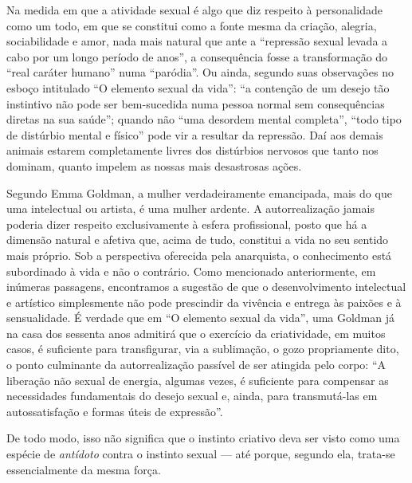 Na medida em que a
atividade sexual é algo que diz respeito à personalidade como um todo,
em que se constitui como a fonte mesma da criação, alegria,
sociabilidade e amor, nada mais natural que ante a ``repressão sexual
levada a cabo por um longo período de anos'', a consequência fosse
a transformação do ``real caráter humano'' numa
``paródia''. Ou ainda, segundo suas observações no esboço intitulado ``O
elemento sexual da vida'': ``a contenção de um desejo tão instintivo não
pode ser bem-sucedida numa pessoa normal sem consequências diretas na
sua saúde''; quando não ``uma desordem mental completa'', ``todo tipo de
distúrbio mental e físico'' pode vir a resultar da repressão. Daí aos
demais animais estarem completamente livres dos distúrbios nervosos que
tanto nos dominam, quanto impelem as nossas mais desastrosas ações.

Segundo Emma Goldman, a mulher verdadeiramente emancipada, mais do que
uma intelectual ou artista, é uma mulher ardente. A autorrealização
jamais poderia dizer respeito exclusivamente à esfera profissional,
posto que há a dimensão natural e afetiva que, acima de tudo, constitui
a vida no seu sentido mais próprio. Sob a perspectiva oferecida pela
anarquista, o conhecimento está subordinado à vida e não o contrário.
Como mencionado anteriormente, em inúmeras passagens, encontramos a
sugestão de que o desenvolvimento intelectual e artístico simplesmente
não pode prescindir da vivência e entrega às paixões e à sensualidade. É
verdade que em ``O elemento sexual da vida'', uma Goldman já na casa dos
sessenta anos admitirá que o exercício da criatividade, em muitos
casos, é suficiente para transfigurar, via a sublimação, o gozo
propriamente dito, o ponto culminante da autorrealização passível de ser
atingida pelo corpo: ``A liberação não sexual de energia, algumas vezes,
é suficiente para compensar as necessidades fundamentais do desejo
sexual e, ainda, para transmutá-las em autossatisfação e formas úteis de
expressão''.

De todo modo, isso não significa que o instinto
criativo deva ser visto como uma espécie de \textit{antídoto} contra o
instinto sexual --- até porque, segundo ela, trata-se essencialmente da
mesma força. 

